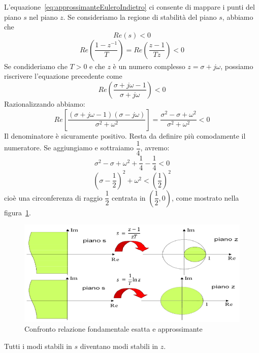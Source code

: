 \documentclass[a4paper]{report}
\begin{document}
L'equazione~\ref{eq:approssimanteEuleroIndietro} ci consente di
mappare i punti del piano $s$ nel piano $z$. Se consideriamo la
regione di stabilit\`a del piano $s$, abbiamo che
\[
Re(s) < 0
\]
\[
Re\left(\dfrac{1 - z^{-1}}{T}\right) = Re\left(\dfrac{z - 1}{Tz}\right) < 0
\]
Se condideriamo che $T > 0$ e che $z$ \`e un numero complesso $z =
\sigma + j \omega$, possiamo riscrivere l'equazione precedente come
\[
Re \left(\dfrac{\sigma + j \omega - 1}{\sigma + j \omega} \right) < 0
\]
Razionalizzando abbiamo:
\[
Re \left[ \dfrac{(\sigma + j \omega -1)(\sigma - j \omega)}{\sigma^2 +
  \omega^2}\right] = \dfrac{\sigma^2 - \sigma + \omega^2}{\sigma^2 +
  \omega^2} < 0
\]
Il denominatore \`e sicuramente positivo. Resta da definire pi\`u
comodamente il numeratore. Se aggiungiamo e sottraiamo $\dfrac{1}{4}$,
avremo:
\[
\sigma^2 - \sigma + \omega^2 + \dfrac{1}{4} - \dfrac{1}{4} < 0
\]
\[
\left( \sigma - \dfrac{1}{2}\right)^2 + \omega^2 < \left(\dfrac{1}{2}\right)^2
\]
cio\`e una circonferenza di raggio $\dfrac{1}{2}$ centrata in
$\left(\dfrac{1}{2},0 \right)$, come mostrato nella
figura~\ref{fig:euleroIndietro01}.
\begin{figure}[!h]
  \begin{center}
    \includegraphics[scale=0.4]{./figures/euleroIndietro01.png}
    \caption{Confronto relazione fondamentale esatta e
      approssimante}\label{fig:euleroIndietro01}  
  \end{center}
\end{figure}
Tutti i modi stabili in $s$ diventano modi stabili in $z$.
\end{document}
